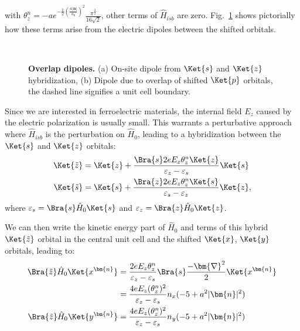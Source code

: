 with $\theta_z^n = -ae^{-\frac{1}{2}\left(\frac{a|\bm{n}|}{a_0}\right)^2}\frac{\pi^{\frac{3}{2}}}{16\sqrt{2}}$, other terms of $\hat{H}_{isb}$ are zero.
Fig.~\ref{fig:Rashba_overlapdip} shows pictorially how these terms arise from the electric dipoles between the shifted orbitals. 
\begin{figure}[t]
~\centering
{}\caption{\label{fig:Rashba_overlapdip} {\bf Overlap dipoles.} (a) On-site dipole from $\Ket{s}$ and $\Ket{z}$ hybridization, (b) Dipole due to overlap of shifted $\Ket{p}$ orbitals, the dashed line signifies a unit cell boundary.}
\end{figure}
Since we are interested in ferroelectric materials, the internal field $E_z$ caused by the electric polarization is usually small.
This warrants a perturbative approach where $\hat{H}_{isb}$ is the perturbation on $\hat{H}_0$, leading to a hybridization between the $\Ket{s}$ and $\Ket{z}$ orbitals:
\begin{align}
	\Ket{\tilde{z}} &= \Ket{z} + \frac{\Bra{s} 2 e E_z \theta^n_z\Ket{z}}{\varepsilon_z - \varepsilon_s}\Ket{s}\\
	\Ket{\tilde{s}}   &= \Ket{s} + \frac{\Bra{z} 2 e E_z \theta^n_z\Ket{s}}{\varepsilon_s - \varepsilon_z}\Ket{z},
\end{align}
where $\varepsilon_s = \Bra{s} \hat{H}_0 \Ket{s}$ and $\varepsilon_z = \Bra{z} \hat{H}_0 \Ket{z}$.

We can then write the kinetic energy part of $\hat{H}_0$ and terms of this hybrid $\Ket{\tilde{z}}$ orbital in the central unit cell and the shifted $\Ket{x}$, $\Ket{y}$ orbitals, leading to:
\begin{align}
	\Bra{\tilde{z}} \hat{H}_0 \Ket{x^{\bm{n}}} &= \frac{2 e E_z \theta_z^n}{\varepsilon_z - \varepsilon_s}\Bra{s} \frac{-\bm{\nabla}^2}{2} \Ket{x^{\bm{n}}}\\
	&= \frac{4 e E_z (\theta_z^n)^2}{\varepsilon_z - \varepsilon_s} n_x (-5 + a^2 |\bm{n}|^2)\\
	\Bra{\tilde{z}} \hat{H}_0 \Ket{y^{\bm{n}}} &= \frac{4 e E_z (\theta_z^n)^2}{\varepsilon_z - \varepsilon_s} n_y (-5 + a^2 |\bm{n}|^2)
\end{align}

